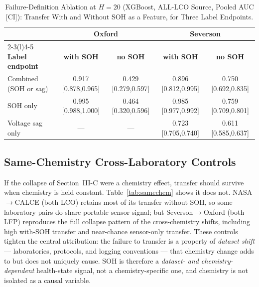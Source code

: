 \begin{table}[!t]
\caption{Failure-Definition Ablation at $H{=}20$ (XGBoost, ALL-LCO Source, Pooled AUC [CI]): Transfer With and Without SOH as a Feature, for Three Label Endpoints.}
\label{tab:faildef}
\centering
\footnotesize
\begin{tabular}{lcccc}
\toprule
 & \multicolumn{2}{c}{\textbf{Oxford}} & \multicolumn{2}{c}{\textbf{Severson}}\\
\cmidrule(lr){2-3}\cmidrule(l){4-5}
\textbf{Label endpoint} & \textbf{with SOH} & \textbf{no SOH} & \textbf{with SOH} & \textbf{no SOH}\\
\midrule
Combined (SOH or sag) & 0.917 [0.878,0.965] & 0.429 [0.279,0.597] & 0.896 [0.812,0.995] & 0.750 [0.692,0.835] \\
SOH only & 0.995 [0.988,1.000] & 0.464 [0.320,0.596] & 0.985 [0.977,0.992] & 0.759 [0.709,0.801] \\
Voltage sag only & --- & --- & 0.723 [0.705,0.740] & 0.611 [0.585,0.637] \\
\bottomrule
\end{tabular}
\end{table}

\subsection{Same-Chemistry Cross-Laboratory Controls}
If the collapse of Section~III-C were a chemistry effect, transfer should survive when chemistry is held constant. Table~\ref{tab:samechem} shows it does not. NASA$\to$CALCE (both LCO) retains most of its transfer without SOH, so some laboratory pairs do share portable sensor signal; but Severson$\to$Oxford (both LFP) reproduces the full collapse pattern of the cross-chemistry shifts, including high with-SOH transfer and near-chance sensor-only transfer. These controls tighten the central attribution: the failure to transfer is a property of \emph{dataset shift} --- laboratories, protocols, and logging conventions --- that chemistry change adds to but does not uniquely cause. SOH is therefore a \emph{dataset- and chemistry-dependent} health-state signal, not a chemistry-specific one, and chemistry is not isolated as a causal variable.

